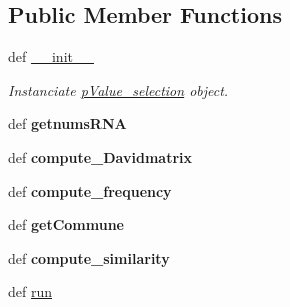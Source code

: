 \subsection*{\-Public \-Member \-Functions}
\begin{DoxyCompactItemize}
\item 
def \hyperlink{classiRNA__stat_1_1pValue__selection_1_1pValue__selection_a724d841b0a4a27332092f68eb7e7516b}{\-\_\-\-\_\-init\-\_\-\-\_\-}
\begin{DoxyCompactList}\small\item\em \-Instanciate \hyperlink{classiRNA__stat_1_1pValue__selection_1_1pValue__selection}{p\-Value\-\_\-selection} object. \end{DoxyCompactList}\item 
\hypertarget{classiRNA__stat_1_1pValue__selection_1_1pValue__selection_a81c0eb7b86546c0091de4d7f7a7f017f}{
def {\bfseries getnums\-R\-N\-A}}
\label{classiRNA__stat_1_1pValue__selection_1_1pValue__selection_a81c0eb7b86546c0091de4d7f7a7f017f}

\item 
\hypertarget{classiRNA__stat_1_1pValue__selection_1_1pValue__selection_aadaa965e9dd801dc78a49f9620e85216}{
def {\bfseries compute\-\_\-\-Davidmatrix}}
\label{classiRNA__stat_1_1pValue__selection_1_1pValue__selection_aadaa965e9dd801dc78a49f9620e85216}

\item 
\hypertarget{classiRNA__stat_1_1pValue__selection_1_1pValue__selection_aa038bb993e070b0facb7bd4390a74da8}{
def {\bfseries compute\-\_\-frequency}}
\label{classiRNA__stat_1_1pValue__selection_1_1pValue__selection_aa038bb993e070b0facb7bd4390a74da8}

\item 
\hypertarget{classiRNA__stat_1_1pValue__selection_1_1pValue__selection_ac882c9e7a1b5ebd76ac0e74e4f9a4502}{
def {\bfseries get\-Commune}}
\label{classiRNA__stat_1_1pValue__selection_1_1pValue__selection_ac882c9e7a1b5ebd76ac0e74e4f9a4502}

\item 
\hypertarget{classiRNA__stat_1_1pValue__selection_1_1pValue__selection_aaccab869eb0421355a8842eebd4c8a74}{
def {\bfseries compute\-\_\-similarity}}
\label{classiRNA__stat_1_1pValue__selection_1_1pValue__selection_aaccab869eb0421355a8842eebd4c8a74}

\item 
def \hyperlink{classiRNA__stat_1_1pValue__selection_1_1pValue__selection_af68fc0d8b25831fae568bf431087105a}{run}
\end{DoxyCompactItemize}
